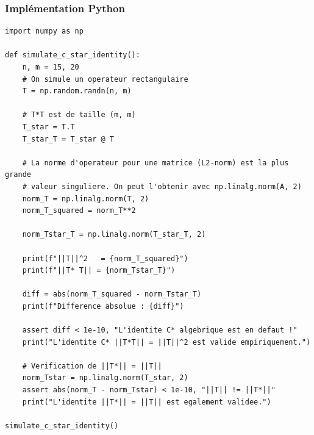 \documentclass[11pt,a4paper]{article}
\begin{document}
\subsubsection*{Implémentation Python}
\begin{lstlisting}
import numpy as np

def simulate_c_star_identity():
    n, m = 15, 20
    # On simule un operateur rectangulaire
    T = np.random.randn(n, m)

    # T*T est de taille (m, m)
    T_star = T.T
    T_star_T = T_star @ T

    # La norme d'operateur pour une matrice (L2-norm) est la plus grande
    # valeur singuliere. On peut l'obtenir avec np.linalg.norm(A, 2)
    norm_T = np.linalg.norm(T, 2)
    norm_T_squared = norm_T**2

    norm_Tstar_T = np.linalg.norm(T_star_T, 2)

    print(f"||T||^2   = {norm_T_squared}")
    print(f"||T* T|| = {norm_Tstar_T}")

    diff = abs(norm_T_squared - norm_Tstar_T)
    print(f"Difference absolue : {diff}")

    assert diff < 1e-10, "L'identite C* algebrique est en defaut !"
    print("L'identite C* ||T*T|| = ||T||^2 est valide empiriquement.")

    # Verification de ||T*|| = ||T||
    norm_Tstar = np.linalg.norm(T_star, 2)
    assert abs(norm_T - norm_Tstar) < 1e-10, "||T|| != ||T*||"
    print("L'identite ||T*|| = ||T|| est egalement validee.")

simulate_c_star_identity()
\end{lstlisting}
\end{document}
